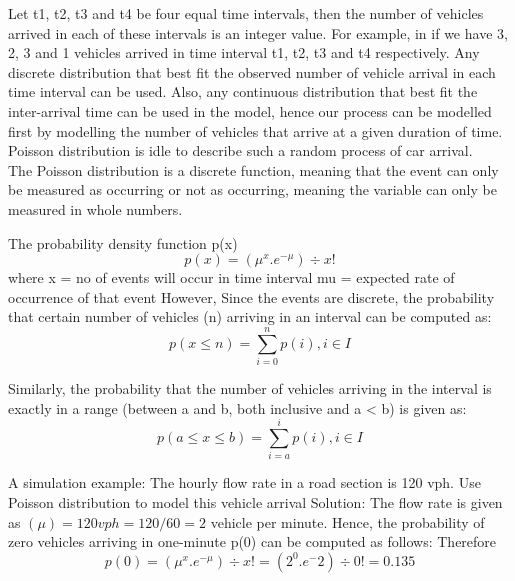 \documentclass{book}
\begin{document}
Let t1, t2, t3 and t4 be four equal time intervals, then the number of vehicles arrived in each of these intervals is an integer value. For example, in if we have 3, 2, 3 and 1 vehicles arrived in time interval t1, t2, t3 and t4 respectively. Any discrete distribution that best
fit the observed number of vehicle arrival in each time interval can be used. Also, any continuous distribution that best fit the inter-arrival time can be used in the model, hence our process can be modelled first by modelling the number of vehicles that arrive at a given duration of time. Poisson distribution is idle to describe such a random process of car arrival.\\
The Poisson distribution is a discrete function, meaning that the event can only be measured as occurring or not as occurring, meaning the variable can only be measured in whole numbers.

The probability density function  p(x)
\begin{equation}
    p(x) = (\mu^x . e^{-\mu})\div x!
\end{equation}
where x = no of events will occur in time interval
    mu = expected rate of occurrence of that event
However, Since the events are discrete, the probability that certain number of vehicles (n) arriving in an interval can be computed as:
\begin{equation}
    p(x\leq n) = \sum_{i=0}^{n} p(i), i\in I
    \end{equation}

Similarly, the probability that the number of vehicles arriving in the interval is exactly in a range (between a and b, both inclusive and a < b) is given as:
\begin{equation}
    p(a\leq x \leq b) = \sum_{i=a}^{i} p(i), i\in I
    \end{equation}


    A simulation example: The hourly flow rate in a road section is 120 vph. Use Poisson distribution to model this vehicle
arrival
Solution: The flow rate is given as $(\mu) = 120 vph = 120/60 = 2$ vehicle per minute. Hence, the probability of zero vehicles arriving in one-minute p(0) can be computed as follows:
Therefore
\begin{equation}
   p(0) = (\mu^x . e^{-\mu}) \div x!  = (2^0 . e^-2)\div 0!   = 0.135
\end{equation}

\end{document}

